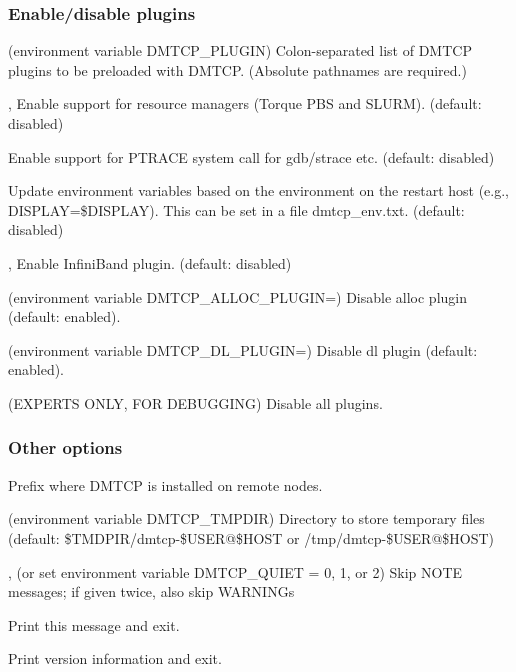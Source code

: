 \subsubsection{Enable/disable plugins}
\begin{Description}
  \item[\OptSArg{--with-plugin}{plugins} (environment variable DMTCP_PLUGIN)]
    Colon-separated list of DMTCP plugins to be preloaded with DMTCP.
    (Absolute pathnames are required.)

  \item[\Opt{--batch-queue}, \Opt{--rm}]
    Enable support for resource managers (Torque PBS and SLURM).
    (default: disabled)

  \item[\Opt{--ptrace}]
    Enable support for PTRACE system call for gdb/strace etc. (default: disabled)

  \item[\Opt{--modify-env}]
    Update environment variables based on the environment on the restart host
    (e.g., DISPLAY=\$DISPLAY).  This can be set in a file dmtcp_env.txt.
    (default: disabled)

  \item[\Opt{--ib}, \Opt{--infiniband}]
    Enable InfiniBand plugin. (default: disabled)

  \item[\Opt{--disable-alloc-plugin} (environment variable DMTCP_ALLOC_PLUGIN=\Lbr01\Rbr)]
    Disable alloc plugin (default: enabled).

  \item[\Opt{--disable-dl-plugin} (environment variable DMTCP_DL_PLUGIN=\Lbr01\Rbr)]
    Disable dl plugin (default: enabled).

  \item[\Opt{--disable-all-plugins} (EXPERTS ONLY, FOR DEBUGGING)]
    Disable all plugins.
\end{Description}

\subsubsection{Other options}
\begin{Description}
  \item[\OptSArg{--prefix}{path}]
    Prefix where DMTCP is installed on remote nodes.

  \item[\OptSArg{--tmpdir}{path} (environment variable DMTCP_TMPDIR)]
    Directory to store temporary files
    (default: \$TMDPIR/dmtcp-\$USER@\$HOST or /tmp/dmtcp-\$USER@\$HOST)

  \item[\Opt{-q}, \Opt{--quiet} (or set environment variable DMTCP_QUIET = 0, 1, or 2)]
    Skip NOTE messages; if given twice, also skip WARNINGs

  \item[\Opt{--help}] Print this message and exit.

  \item[\Opt{--version}] Print version information and exit.
\end{Description}
